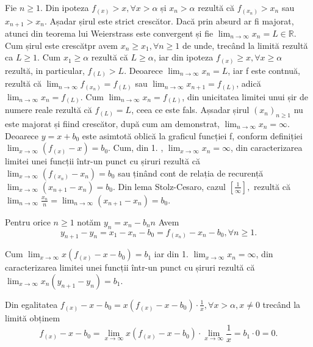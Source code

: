 \documentclass[a4paper,12pt,oneside]{report}
\begin{document}
Fie \(n\geq 1\). Din ipoteza \(f_{\left ( x \right )}> x, \forall x> \alpha\) și \(x_{n}> \alpha\) rezultă că \(f_{\left ( x_{n} \right )}> x_{n}\) sau \(x_{n+1}> x_{n}\). Așadar șirul este strict crescător. Dacă prin absurd ar fi majorat, atunci din  teorema lui Weierstrass este convergent și fie \(\lim_{n \to \infty }x_{n} = L\in \mathbb{R}\). Cum șirul este crescătpr avem \(x_{n}\geq x_{1}, \forall n\geq 1\) de unde, trecând la limită rezultă ca \(L \geq 1\). Cum \(x_{1}\geq \alpha\) rezultă că \(L\geq \alpha\), iar din ipoteza \(f_{\left ( x \right )}\geq x, \forall x\geq \alpha\) rezultă, in particular, \(f_{\left ( L \right )}> L\). Deoarece \(\lim_{n \to \infty }x_{n}= L\), iar f este contnuă, rezultă că \(\lim_{n \to \infty }f_{\left ( x_{n} \right )} = f_{\left ( L \right )}\) sau \(\lim_{n \to \infty }x_{n+1} = f_{\left ( L \right )}\), adică \(\lim_{n \to \infty }x_{n} = f_{\left ( L \right )}\). Cum \(\lim_{n \to \infty }x_{n} = f_{\left ( L \right )}\), din unicitatea limitei unui șir de numere reale rezultă că \(f_{\left ( L \right )} = L\), ceea ce este fals. Așsadar șirul \(\left ( x_{n} \right )_{n\geq 1}\) nu este majorat și fiind crescător, după cum am demonstrat, \(\lim_{n \to \infty }x_{n}=\infty\). 
Deoarece \(y= x + b_{0}\) este asimtotă oblică la graficul funcției f, conform definiției \(\lim_{x \to \infty }\left ( f_{\left ( x \right )}-x \right )= b_{0}\). Cum, din 1. , \(\lim_{x \to \infty }x_{n} = \infty\), din caracterizarea limitei unei funcții într-un punct cu șiruri rezultă că \(\lim_{x \to \infty }\left ( f_{\left ( x_{n} \right )} -x_{n}\right )= b_{0}\) sau ținând cont de relația de recurență \(\lim_{x \to \infty }\left ( x_{n+1} -x_{n}\right )=b_{0}\). Din lema Stolz-Cesaro, cazul \(\left [ \frac{1}{\infty } \right ],\) rezultă că \(\lim_{n \to \infty }\frac{x_{n}}{n}= \lim_{n \to \infty}\left ( x_{n+1} -x_{n}\right ) = b_{0}\).

Pentru orice \(n\geq 1\) notăm \(y_{n}= x_{n}-b_{n}n\) Avem 
\begin{displaymath}
  y_{n+1}-y_{n}= x_{1}-x_{n}-b_{0} = f_{\left ( x_{n} \right )}-x_{n}-b_{0},\forall n\geq 1.
\end{displaymath}

Cum \(\lim_{x \to \infty }x\left ( f_{\left ( x \right )} -x-b_{0}\right )=b_{1}\) iar din 1. \(\lim_{x \to \infty }x_{n}=\infty\), din caracterizarea limitei unei funcții într-un punct cu șiruri rezultă că \(\lim_{x \to \infty }x_{n}\left ( y_{n+1} -y_{n}\right )=b_{1}\).

Din egalitatea \(f_{\left ( x \right )}-x-b_{0}= x\left ( f_{\left ( x \right )}-x-b_{0} \right )\cdot \frac{1}{x}, \forall x>\alpha,x  \neq 0\) trecând la limită obținem 
\begin{displaymath}
  f_{\left ( x \right )}-x-b_{0}= \lim_{x \to \infty }x\left ( f_{\left ( x \right )}-x-b_{0} \right )\cdot \lim_{x \to \infty }\frac{1}{x} = b_{1}\cdot 0 = 0.
\end{displaymath}
\end{document}
